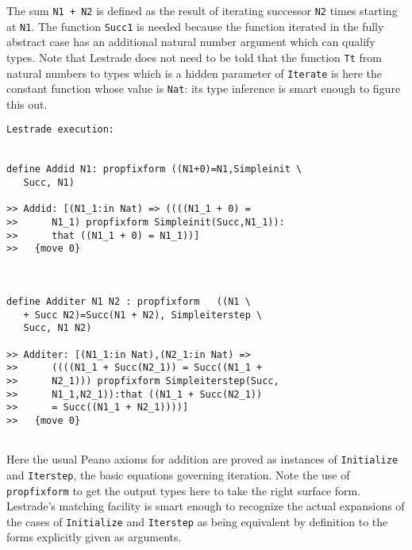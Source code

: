 \documentclass[12pt]{article}
\begin{document}
The sum {\tt N1 + N2} is defined as the result of iterating successor {\tt N2} times starting at {\tt N1}.  The function {\tt Succ1} is needed because the function iterated in the fully abstract case
has an additional natural number argument which can qualify types.  Note that Lestrade does not need to be told that the function {\tt Tt} from natural numbers to types which is a hidden parameter of {\tt Iterate} is here the constant function whose
value is {\tt Nat}:  its type inference is smart enough to figure this out.

\begin{verbatim}Lestrade execution:


define Addid N1: propfixform ((N1+0)=N1,Simpleinit \
   Succ, N1)

>> Addid: [(N1_1:in Nat) => ((((N1_1 + 0) =
>>      N1_1) propfixform Simpleinit(Succ,N1_1)):
>>      that ((N1_1 + 0) = N1_1))]
>>   {move 0}



define Additer N1 N2 : propfixform   ((N1 \
   + Succ N2)=Succ(N1 + N2), Simpleiterstep \
   Succ, N1 N2)

>> Additer: [(N1_1:in Nat),(N2_1:in Nat) =>
>>      ((((N1_1 + Succ(N2_1)) = Succ((N1_1 +
>>      N2_1))) propfixform Simpleiterstep(Succ,
>>      N1_1,N2_1)):that ((N1_1 + Succ(N2_1))
>>      = Succ((N1_1 + N2_1))))]
>>   {move 0}


\end{verbatim}

Here the usual Peano axioms for addition are proved as instances of {\tt Initialize} and {\tt Iterstep}, the basic equations governing iteration.  Note the use of {\tt propfixform} to get
the output types here to take the right surface form.  Lestrade's matching facility is smart enough to recognize the actual expansions of the cases of {\tt Initialize} and {\tt Iterstep} as being equivalent by definition
to the forms explicitly given as arguments.
\end{document}
